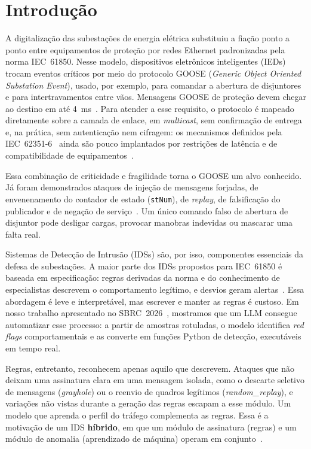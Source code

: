 \documentclass[12pt]{article}
\newcommand{\ataque}[1]{\textit{#1}}
\begin{document}
\section{Introdução}

A digitalização das subestações de energia elétrica substituiu a fiação
ponto a ponto entre equipamentos de proteção por redes Ethernet padronizadas
pela norma IEC~61850. Nesse modelo, dispositivos eletrônicos inteligentes
(IEDs) trocam eventos críticos por meio do protocolo GOOSE (\textit{Generic
Object Oriented Substation Event}), usado, por exemplo, para comandar a abertura
de disjuntores e para intertravamentos entre vãos. Mensagens GOOSE de proteção
devem chegar ao destino em até 4~ms~\cite{iec61850-8-1}. Para atender a esse
requisito, o protocolo é mapeado diretamente sobre a camada de enlace, em
\textit{multicast}, sem confirmação de entrega e, na prática, sem autenticação
nem cifragem: os mecanismos definidos pela IEC~62351-6~\cite{iec62351-6} ainda
são pouco implantados por restrições de latência e de compatibilidade de
equipamentos~\cite{quincozes2021survey,doostmohammadi2026survey}.

Essa combinação de criticidade e fragilidade torna o GOOSE um alvo conhecido.
Já foram demonstrados ataques de injeção de mensagens forjadas, de
envenenamento do contador de estado (\texttt{stNum}), de \textit{replay}, de
falsificação do publicador e de negação de
serviço~\cite{hoyos2012exploiting,kush2014poisoned,boeding2023testbed,roa2023gooseattacker}.
Um único comando falso de abertura de disjuntor pode desligar cargas,
provocar manobras indevidas ou mascarar uma falta real.

Sistemas de Detecção de Intrusão (IDSs) são, por isso, componentes essenciais
da defesa de subestações. A maior parte dos IDSs propostos para IEC~61850 é
baseada em especificação: regras derivadas da norma e do conhecimento de
especialistas descrevem o comportamento legítimo, e desvios geram
alertas~\cite{hong2014integrated,yang2017multidimensional,hong2019ieds,quincozes2021survey}.
Essa abordagem é leve e interpretável, mas escrever e manter as regras é
custoso. Em nosso trabalho apresentado no SBRC~2026~\cite{martins2026redflags},
mostramos que um LLM consegue automatizar esse processo: a partir de amostras
rotuladas, o modelo identifica \textit{red flags} comportamentais e as converte
em funções Python de detecção, executáveis em tempo real.

Regras, entretanto, reconhecem apenas aquilo que descrevem. Ataques que não
deixam uma assinatura clara em uma mensagem isolada, como o descarte seletivo
de mensagens (\ataque{grayhole}) ou o reenvio de quadros legítimos
(\ataque{random\_replay}), e variações não vistas durante a geração das regras
escapam a esse módulo. Um modelo que aprenda o perfil do tráfego complementa as
regras. Essa é a motivação de um IDS \textbf{híbrido}, em que um módulo de
assinatura (regras) e um módulo de anomalia (aprendizado de máquina) operam em
conjunto~\cite{girdhar2024sdn,yoon2025sdn}.
\end{document}
